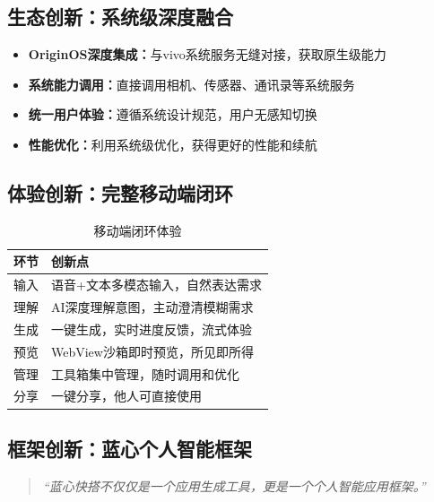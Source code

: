 \documentclass[a4paper,12pt]{ctexart}
\newcommand{\highlight}[1]{\textcolor{vivoblue}{\textbf{#1}}}
\begin{document}
\subsection{生态创新：系统级深度融合}

\begin{itemize}[leftmargin=2em]
    \item \highlight{OriginOS深度集成：}与vivo系统服务无缝对接，获取原生级能力
    \item \highlight{系统能力调用：}直接调用相机、传感器、通讯录等系统服务
    \item \highlight{统一用户体验：}遵循系统设计规范，用户无感知切换
    \item \highlight{性能优化：}利用系统级优化，获得更好的性能和续航
\end{itemize}

\subsection{体验创新：完整移动端闭环}

\begin{table}[H]
    \centering
    \caption{移动端闭环体验}
    \begin{tabularx}{\textwidth}{|l|X|}
        \hline
        \textbf{环节} & \textbf{创新点} \\
        \hline
        输入 & 语音+文本多模态输入，自然表达需求 \\
        \hline
        理解 & AI深度理解意图，主动澄清模糊需求 \\
        \hline
        生成 & 一键生成，实时进度反馈，流式体验 \\
        \hline
        预览 & WebView沙箱即时预览，所见即所得 \\
        \hline
        管理 & 工具箱集中管理，随时调用和优化 \\
        \hline
        分享 & 一键分享，他人可直接使用 \\
        \hline
    \end{tabularx}
\end{table}

\subsection{框架创新：蓝心个人智能框架}

\begin{quote}
    \textit{``蓝心快搭不仅仅是一个应用生成工具，更是一个个人智能应用框架。''}
\end{quote}
\end{document}
